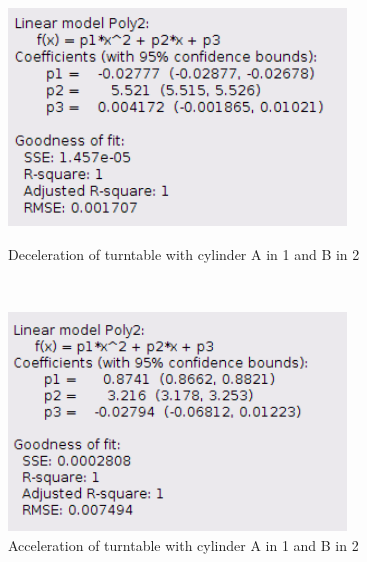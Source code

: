     \begin{figure}[H]
    \centering
    \begin{minipage}{0.45\textwidth}
        \includegraphics[width=0.8\textwidth]{images/41info}
        \caption{Deceleration of turntable with cylinder A in 1 and B in 2}\label{41info}
    \end{minipage}
    ~
    \begin{minipage}{0.45\textwidth}
        \includegraphics[width=0.8\textwidth]{images/42info}
        \caption{Acceleration of turntable with cylinder A in 1 and B in 2}\label{42info}
    \end{minipage}
    \end{figure}


